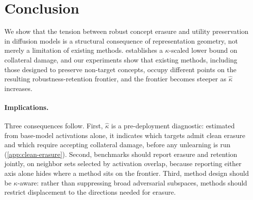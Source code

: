 \section{Conclusion}
\label{sec:conclusion}
We show that the tension between robust concept erasure and utility preservation in diffusion models is a structural consequence of representation geometry, not merely a limitation of existing methods.
 establishes a $\kappa$-scaled lower bound on collateral damage, and our experiments show that existing methods, including those designed to preserve non-target concepts, occupy different points on the resulting robustness-retention frontier, and the frontier becomes steeper as $\hat\kappa$ increases.

\paragraph{Implications.} Three consequences follow. First, $\hat\kappa$ is a pre-deployment diagnostic: estimated from base-model activations alone, it indicates which targets admit clean erasure and which require accepting collateral damage, before any unlearning is run (\cref{app:clean-erasure}). Second, benchmarks should report erasure and retention jointly, on neighbor sets selected by activation overlap, because reporting either axis alone hides where a method sits on the frontier. Third, method design should be $\kappa$-aware: rather than suppressing broad adversarial subspaces, methods should restrict displacement to the directions needed for erasure.



